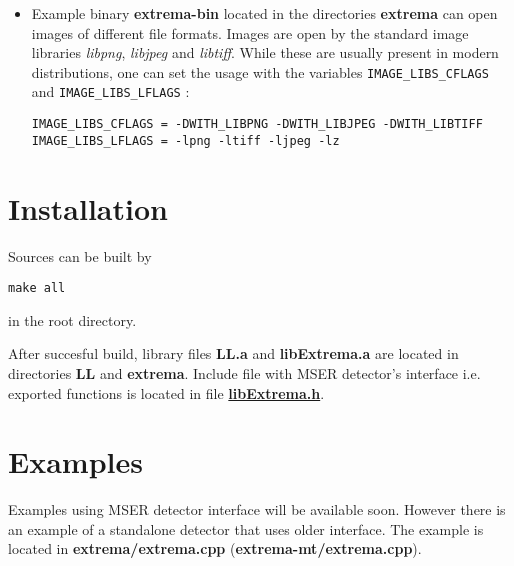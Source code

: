 \begin{itemize}
\item Example binary {\bf extrema-bin} located in the directories {\bf extrema} can open images of different file formats. Images are open by the standard image libraries {\em libpng\/}, {\em libjpeg\/} and {\em libtiff\/}. While these are usually present in modern distributions, one can set the usage with the variables {\tt IMAGE\_\-LIBS\_\-CFLAGS} and {\tt IMAGE\_\-LIBS\_\-LFLAGS} : 

\begin{Code}\begin{verbatim}IMAGE_LIBS_CFLAGS = -DWITH_LIBPNG -DWITH_LIBJPEG -DWITH_LIBTIFF
IMAGE_LIBS_LFLAGS = -lpng -ltiff -ljpeg -lz
\end{verbatim}\end{Code}

\end{itemize}
\hypertarget{main_Installation}{}\section{Installation}\label{main_Installation}
Sources can be built by 

\begin{Code}\begin{verbatim}make all
\end{verbatim}\end{Code}

 in the root directory.

After succesful build, library files {\bf LL.a} and {\bf lib\-Extrema.a} are located in directories {\bf LL} and {\bf extrema}. Include file with MSER detector's interface i.e. exported functions is located in file {\bf \hyperlink{libExtrema_8h}{lib\-Extrema.h}}.\hypertarget{main_examples}{}\section{Examples}\label{main_examples}
Examples using MSER detector interface will be available soon. However there is an example of a standalone detector that uses older interface. The example is located in {\bf extrema/extrema.cpp} ({\bf extrema-mt/extrema.cpp}). 